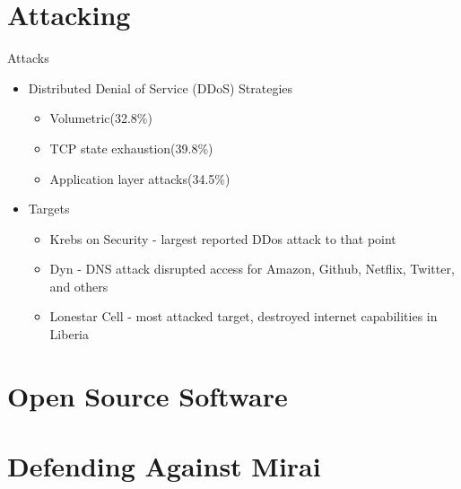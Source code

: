 \documentclass{beamer}
\begin{document}
\section{Attacking}
\begin{frame}{Attacks}
	\begin{itemize}
		\item<+->Distributed Denial of Service (DDoS) Strategies
			\begin{itemize}
				\item<+->Volumetric(32.8\%)
				\item<+->TCP state exhaustion(39.8\%)
				\item<+->Application layer attacks(34.5\%)
			\end{itemize}
		\item<+->Targets
			\begin{itemize}
				\item<+->Krebs on Security - largest reported DDos attack to that point
				\item<+->Dyn - DNS attack disrupted access for Amazon, Github, Netflix, Twitter, and others
				\item<+->Lonestar Cell - most attacked target, destroyed internet capabilities in Liberia
			\end{itemize}
	\end{itemize}
\end{frame}
	\begin{itemize}
		
	\end{itemize}
\begin{frame}
	
\end{frame}

\section{Open Source Software}

\section{Defending Against Mirai}
\end{document}
